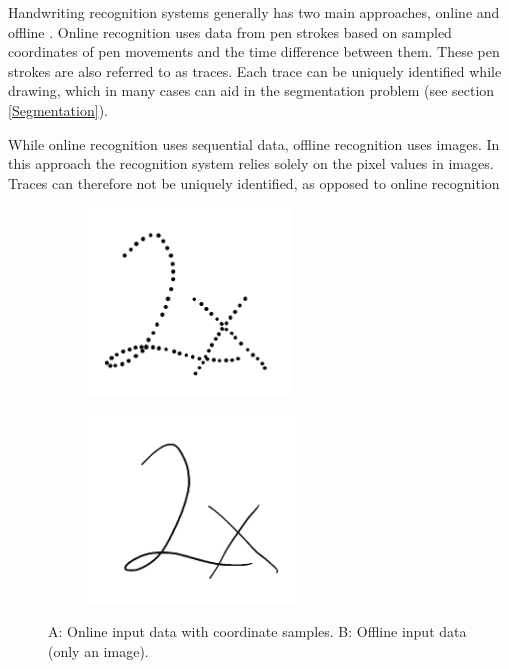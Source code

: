 Handwriting recognition systems generally has two main approaches, online and offline \cite{priya_online_2016}. Online recognition uses data from pen strokes based on sampled coordinates of pen movements and the time difference between them. These pen strokes are also referred to as traces.  Each trace can be uniquely identified while drawing, which in many cases can aid in the segmentation problem (see section \ref{Segmentation}).

While online recognition uses sequential data, offline recognition uses images. In this approach the recognition system relies solely on the pixel values in images. Traces can therefore not be uniquely identified, as opposed to online recognition


\begin{figure}[H]
\centering
\begin{subfigure}{0.3\textwidth}
\includegraphics[width=1.1\linewidth, height=5cm]{Assets/Chapter2_Theory/segmentation_2_on.png} 
\caption{}
\label{fig:online_data}
\end{subfigure}
\begin{subfigure}{0.3\textwidth}
\includegraphics[width=1.1\linewidth, height=5cm]{Assets/Chapter2_Theory/segmentation_2.png}
\caption{}
\label{fig:offline_data}
\end{subfigure}
\caption{A: Online input data with coordinate samples. B: Offline input data (only an image).}
\label{fig:online_offline_comparison}
\end{figure}


